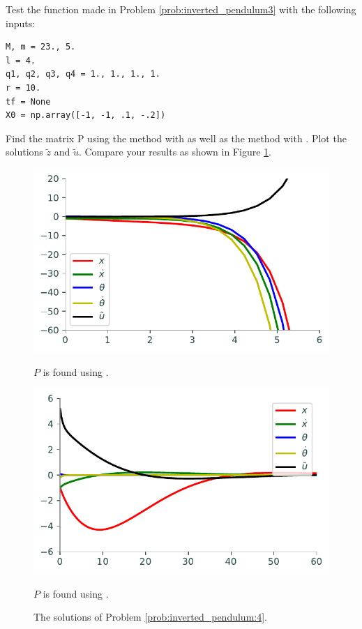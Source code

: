 \begin{problem}
Test the function made in Problem \eqref{prob:inverted_pendulum3} with the following inputs: 
\begin{lstlisting}
M, m = 23., 5.
l = 4.
q1, q2, q3, q4 = 1., 1., 1., 1.
r = 10.
tf = None
X0 = np.array([-1, -1, .1, -.2])
\end{lstlisting}
Find the matrix P using the  method with  as well as the  method with .
Plot the solutions $\tilde{z}$ and $\tilde{u}$. 
Compare your results as shown in Figure \ref{fig:inverted_pendulum:4}.
\label{prob:inverted_pendulum:4}
\end{problem}

\begin{figure}
\begin{minipage}[b]{.47\linewidth}
\centering
\includegraphics[width=\textwidth]{figures/prob4_unstable.pdf}
\caption*{$P$ is found using .}
\end{minipage}
\hspace{0.5cm}
\begin{minipage}[b]{0.47\linewidth}
\centering
\includegraphics[width=\textwidth]{figures/prob4_stable.pdf}
\caption*{$P$ is found using .}
\end{minipage}
\caption{The solutions of Problem \ref{prob:inverted_pendulum:4}.}
\label{fig:inverted_pendulum:4}
\end{figure}

